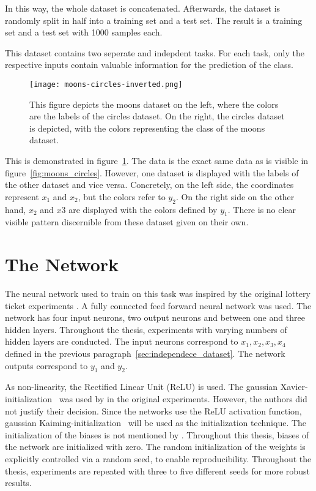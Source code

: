 In this way, the whole dataset is concatenated.
Afterwards, the dataset is randomly split in half into a training set and a test set.
The result is a training set and a test set with 1000 samples each.

This dataset contains two seperate and indepdent tasks.
For each task, only the respective inputs contain valuable information for the prediction of the class.

\begin{figure}[ht]
    \centering
    \texttt{[image: moons-circles-inverted.png]}
    \caption{
        This figure depicts the moons dataset on the left, where the colors are the labels of the circles dataset.
        On the right, the circles dataset is depicted, with the colors representing the class of the moons dataset.
    }\label{fig:moons_circles_inverted}
\end{figure}

This is demonstrated in figure~\ref{fig:moons_circles_inverted}.
The data is the exact same data as is visible in figure~\ref{fig:moons_circles}. 
However, one dataset is displayed with the labels of the other dataset and vice versa.
Concretely, on the left side, the coordinates represent $x_1$ and $x_2$, but the colors refer to $y_2$.
On the right side on the other hand, $x_2$ and $x3$ are displayed with the colors defined by $y_1$.
There is no clear visible pattern discernible from these dataset given on their own.

\section{The Network}
The neural network used to train on this task was inspired by the original lottery ticket experiments \autocite{DBLP:conf/iclr/FrankleC19}. 
A fully connected feed forward neural network was used.
The network has four input neurons, two output neurons and between one and three hidden layers.
Throughout the thesis, experiments with varying numbers of hidden layers are conducted.
The input neurons correspond to $x_1, x_2, x_3, x_4$ defined in the previous paragraph~\ref{sec:independece_dataset}.
The network outputs correspond to $y_1$ and $y_2$.

As non-linearity, the Rectified Linear Unit (ReLU) is used.
The gaussian Xavier-initialization~\textcite{XAVIER-GLOROT} was used by \textcite{DBLP:conf/iclr/FrankleC19} in the original experiments.
However, the authors did not justify their decision.
Since the networks use the ReLU activation function, gaussian Kaiming-initialization~\autocite{KAIMING-HE} will be used as the initialization technique.
The initialization of the biases is not mentioned by \textcite{DBLP:conf/iclr/FrankleC19}.
Throughout this thesis, biases of the network are initialized with zero.
The random initialization of the weights is explicitly controlled via a random seed, to enable reproducibility.
Throughout the thesis, experiments are repeated with three to five different seeds for more robust results.

